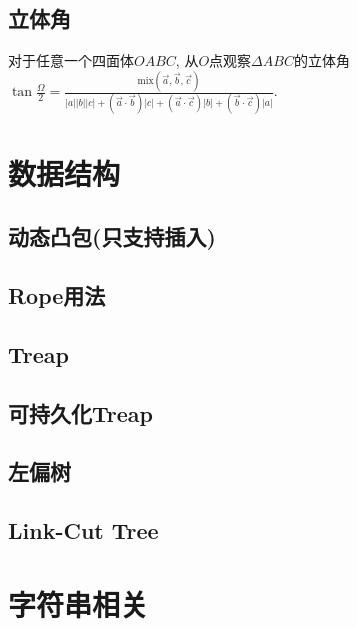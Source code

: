 \documentclass[landscape, twocolumn, 8pt, a4paper, twoside]{extarticle}
\begin{document}
  \subsection{立体角}
  对于任意一个四面体$OABC$,
  从$O$点观察$\Delta ABC$的立体角$\tan{\frac{\Omega}{2}} = 
  \frac{\textrm{mix}(\overrightarrow{a}, \overrightarrow{b}, \overrightarrow{c}) }{
  |a||b||c|
  + (\overrightarrow{a} \cdot \overrightarrow{b}) |c|
  + (\overrightarrow{a} \cdot \overrightarrow{c}) |b|
  + (\overrightarrow{b} \cdot \overrightarrow{c}) |a|
}$.

\section{数据结构}
\subsection{动态凸包(只支持插入)}


\subsection{Rope用法}


\subsection{Treap}


\subsection{可持久化Treap}


\subsection{左偏树}


\subsection{Link-Cut Tree}


\section{字符串相关}
\end{document}
